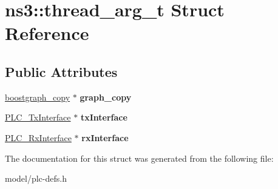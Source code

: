 \hypertarget{structns3_1_1thread__arg__t}{\section{ns3\-:\-:thread\-\_\-arg\-\_\-t \-Struct \-Reference}
\label{structns3_1_1thread__arg__t}
}
\subsection*{\-Public \-Attributes}
\begin{DoxyCompactItemize}
\item 
\hypertarget{structns3_1_1thread__arg__t_afb1fa8ace0f9b44a18acde5e07618855}{\hyperlink{structns3_1_1boostgraph__copy__t}{boostgraph\-\_\-copy} $\ast$ {\bfseries graph\-\_\-copy}}\label{structns3_1_1thread__arg__t_afb1fa8ace0f9b44a18acde5e07618855}

\item 
\hypertarget{structns3_1_1thread__arg__t_a3786cfc3ef15ebf241a495fc7357d5ff}{\hyperlink{classns3_1_1PLC__TxInterface}{\-P\-L\-C\-\_\-\-Tx\-Interface} $\ast$ {\bfseries tx\-Interface}}\label{structns3_1_1thread__arg__t_a3786cfc3ef15ebf241a495fc7357d5ff}

\item 
\hypertarget{structns3_1_1thread__arg__t_a97a3a9964f435efa8d9be12a5bb99bdc}{\hyperlink{classns3_1_1PLC__RxInterface}{\-P\-L\-C\-\_\-\-Rx\-Interface} $\ast$ {\bfseries rx\-Interface}}\label{structns3_1_1thread__arg__t_a97a3a9964f435efa8d9be12a5bb99bdc}

\end{DoxyCompactItemize}


\-The documentation for this struct was generated from the following file\-:\begin{DoxyCompactItemize}
\item 
model/plc-\/defs.\-h\end{DoxyCompactItemize}
